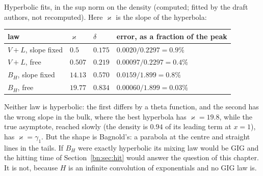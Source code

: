 Hyperbolic fits, in the sup norm on the density (computed; %
fitted by the draft authors, not recomputed). Here $\varkappa$ is the slope of the hyperbola:
\begin{center}
\small
\begin{tabular}{llll}
\toprule
law & $\varkappa$ & $\delta$ & error, as a fraction of the peak\\
\midrule
$V+L$, slope fixed & $0.5$ & $0.175$ & $0.0020/0.2297=0.9\%$\\
$V+L$, free & $0.507$ & $0.219$ & $0.00097/0.2297=0.4\%$\\
$B_H$, slope fixed & $14.13$ & $0.570$ & $0.0159/1.899=0.8\%$\\
$B_H$, free & $19.77$ & $0.834$ & $0.00060/1.899=0.03\%$\\
\bottomrule
\end{tabular}
\end{center}
Neither law is hyperbolic: the first differs by a theta function, and the second has the wrong slope in the bulk, where the best hyperbola has $\varkappa=19.8$, while the true asymptote, reached slowly (the density is $0.94$ of its leading term at $x=1$), has $\varkappa=\gamma_1$. But the shape is Bagnold's: a parabola at the centre and straight lines in the tails. If $B_H$ were exactly hyperbolic its mixing law would be GIG and the hitting time of Section~\ref{bn:sec:hit} would answer the question of this chapter. It is not, because $H$ is an infinite convolution of exponentials and no GIG law is.

